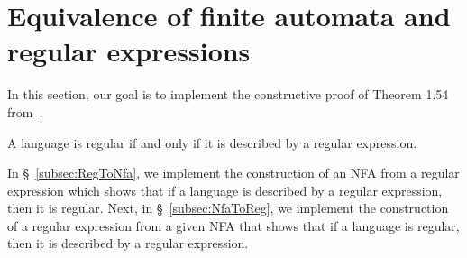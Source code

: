 \section{Equivalence of finite automata and regular expressions}\label{sec:equivalence_regex_fa}

In this section, our goal is to implement the constructive proof of Theorem 1.54 from~\cite{sipser2012}.

\begin{theorem}
    A language is regular if and only if it is described by a regular expression.
\end{theorem}

In \S~\ref{subsec:RegToNfa}, we implement the construction of an NFA from a regular expression 
which shows that if a language is described by a regular expression, then it is regular.
Next, in \S~\ref{subsec:NfaToReg}, we implement the construction of a regular expression from a given NFA
that shows that if a language is regular, then it is described by a regular expression.